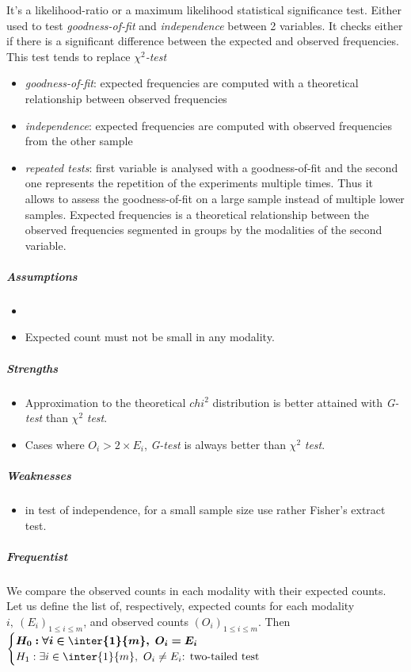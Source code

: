 It's a likelihood-ratio or a maximum likelihood statistical significance test. 
Either used to test \emph{goodness-of-fit} and \emph{independence} between 2 variables.
It checks either if there is a significant difference between the expected and observed 
frequencies. This test tends to replace $\chi^{2}$\emph{-test}
\begin{itemize}
    \item \emph{goodness-of-fit}: expected frequencies are computed with a theoretical 
        relationship between observed frequencies
    \item \emph{independence}: expected frequencies are computed with observed frequencies
        from the other sample
    \item \emph{repeated tests}: first variable is analysed with a goodness-of-fit and the
        second one represents the repetition of the experiments multiple times. Thus it
        allows to assess the goodness-of-fit on a large sample instead of multiple lower
        samples. Expected frequencies is a theoretical relationship between the observed
        frequencies segmented in groups by the modalities of the second variable.
\end{itemize}


\subparagraph{Assumptions}
\begin{itemize}
    \item 
    \item Expected count must not be small in any modality.
\end{itemize}

\subparagraph{Strengths}
\begin{itemize}
    \item Approximation to the theoretical $chi^{2}$ distribution is better attained with
        \emph{G-test} than $\chi^{2}$ \emph{test}.
    \item Cases where $O_{i} > 2\times E_{i}$, \emph{G-test} is always better than
        $\chi^{2}$ \emph{test}.
\end{itemize}

\subparagraph{Weaknesses}
\begin{itemize}
    \item in test of independence, for a small sample size use rather Fisher's extract 
        test.
\end{itemize}


\subparagraph{Frequentist}
We compare the observed counts in each modality with their expected counts.
Let us define the list of, respectively, expected counts for each modality 
$i,~(E_{i})_{1\leq i\leq m}$, and observed counts $(O_{i})_{1\leq i\leq m}$.
Then
$\begin{cases}
    \bm{H_{0}: \forall i\in \inter{1}{m},~O_{i} = E_{i}}\\
    H_{1}: \exists i\in \inter{1}{m},~O_{i} \neq E_{i}\text{: two-tailed test} \\
\end{cases}$

